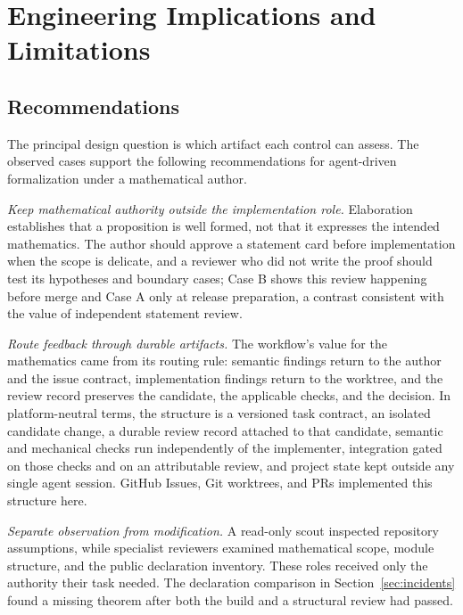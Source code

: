 \section{Engineering Implications and Limitations}\label{sec:discussion}

\subsection{Recommendations}

The principal design question is which artifact each control can assess.
The observed cases support the following recommendations for agent-driven
formalization under a mathematical author. %

\emph{Keep mathematical authority outside the implementation role.}
Elaboration establishes that a proposition is well formed, not that it
expresses the intended mathematics. The author should approve a statement
card before implementation when the scope is delicate, and a reviewer who
did not write the proof should test its hypotheses and boundary cases;
Case B shows this review happening before merge and Case A only at
release preparation, a contrast consistent with the value of independent
statement review. %

\emph{Route feedback through durable artifacts.}
The workflow's value for the mathematics came from its routing rule:
semantic findings return to the author and the issue contract,
implementation findings return to the worktree, and the review record
preserves the candidate, the applicable checks, and the decision. In
platform-neutral terms, the structure is a versioned task contract, an
isolated candidate change, a durable review record attached to that
candidate, semantic and mechanical checks run independently of the
implementer, integration gated on those checks and on an attributable
review, and project state kept outside any single agent session. GitHub
Issues, Git worktrees, and PRs implemented this structure here.

\emph{Separate observation from modification.}
A read-only scout inspected repository assumptions, while specialist
reviewers examined mathematical scope, module structure, and the public
declaration inventory. These roles received only the authority their
task needed. The declaration comparison in Section~\ref{sec:incidents} found a missing
theorem after both the build and a structural review had passed.

